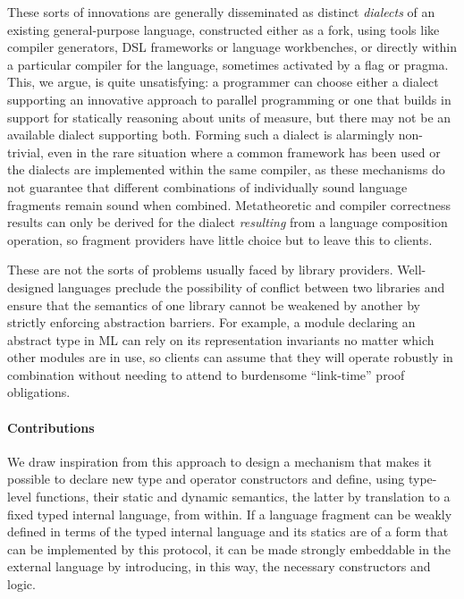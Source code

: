 \documentclass[9pt,preprint]{sigplanconf}
\begin{document}
These sorts of innovations are generally disseminated as distinct \emph{dialects} of an existing general-purpose language, constructed either as a fork, using tools like compiler generators, DSL frame\-works or  language workbenches, or directly within a particular compiler for the language, sometimes activated by a flag or pragma. This, we argue, is quite unsatisfying: a programmer can choose either a dialect supporting an innovative approach to parallel programming or one that builds in support for statically reasoning about units of measure, but there may not be an available dialect supporting both. Forming such a dialect is alarmingly non-trivial, even in the rare situation where a common framework has been used or the dialects are implemented within the same compiler, as these mechanisms do not guarantee that different combinations of individually sound language fragments remain sound when combined. Metatheoretic and compiler correctness results can only be derived for the dialect \emph{resulting} from a language   composition operation, so fragment providers have little choice but to leave this to clients.%

These are not the sorts of problems usually faced by library providers. Well-designed languages preclude the  possibility of conflict between two libraries and ensure that the semantics of one library  cannot be weakened by another by strictly enforcing abstraction barriers. For example, a module declaring an abstract type in ML can rely on its representation invariants no matter which other modules are in use, so clients can assume that they will operate robustly in combination without needing to attend to burdensome ``link-time'' proof obligations. 

\paragraph{Contributions}
We draw inspiration from this approach to design a mechanism that makes it possible to declare new type and operator constructors and define,  {using type-level functions}, their static and dynamic semantics, the latter by translation to a fixed typed internal language, from within. If a language fragment can be weakly defined in terms of the typed internal language and its statics are of a form that can be implemented by this protocol, it can be made strongly embeddable in the external language by introducing, in this way, the necessary constructors and logic. 
\end{document}
